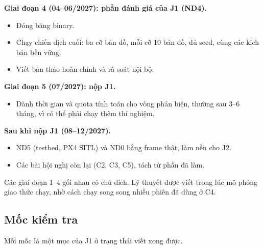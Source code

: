 \textbf{Giai đoạn 4 (04--06/2027): phần đánh giá của J1 (ND4).}

\begin{itemize}
\tightlist
\item
  Đóng băng binary.
\item
  Chạy chiến dịch cuối: ba cỡ bản đồ, mỗi cỡ 10 bản đồ, đủ seed, cùng
  các kịch bản bền vững.
\item
  Viết bản thảo hoàn chỉnh và rà soát nội bộ.
\end{itemize}

\textbf{Giai đoạn 5 (07/2027): nộp J1.}

\begin{itemize}
\tightlist
\item
  Dành thời gian và quota tính toán cho vòng phản biện, thường sau 3--6
  tháng, vì có thể phải chạy thêm thí nghiệm.
\end{itemize}

\textbf{Sau khi nộp J1 (08--12/2027).}

\begin{itemize}
\tightlist
\item
  ND5 (testbed, PX4 SITL) và ND0 bằng frame thật, làm nền cho J2.
\item
  Các bài hội nghị còn lại (C2, C3, C5), tách từ phần đã làm.
\end{itemize}

Các giai đoạn 1--4 gối nhau có chủ đích. Lý thuyết được viết trong lúc
mô phỏng giao thức chạy, nhờ cách chạy song song nhiều phiên đã dùng ở
C4.

\subsection{Mốc kiểm tra}

Mỗi mốc là một mục của J1 ở trạng thái viết xong được.

